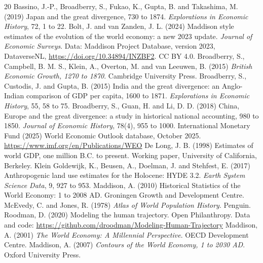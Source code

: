 \documentclass[11pt,a4paper]{article}
\begin{document}
\begin{thebibliography}{20}
 Bassino, J.-P., Broadberry, S., Fukao, K., Gupta, B. and Takashima, M. (2019) Japan and the great divergence, 730 to 1874. \textit{Explorations in Economic History}, 72, 1 to 22.
 Bolt, J. and van Zanden, J. L. (2024) Maddison style estimates of the evolution of the world economy: a new 2023 update. \textit{Journal of Economic Surveys}. Data: Maddison Project Database, version 2023, DataverseNL, \url{https://doi.org/10.34894/INZBF2}. CC BY 4.0.
 Broadberry, S., Campbell, B. M. S., Klein, A., Overton, M. and van Leeuwen, B. (2015) \textit{British Economic Growth, 1270 to 1870}. Cambridge University Press.
 Broadberry, S., Custodis, J. and Gupta, B. (2015) India and the great divergence: an Anglo-Indian comparison of GDP per capita, 1600 to 1871. \textit{Explorations in Economic History}, 55, 58 to 75.
 Broadberry, S., Guan, H. and Li, D. D. (2018) China, Europe and the great divergence: a study in historical national accounting, 980 to 1850. \textit{Journal of Economic History}, 78(4), 955 to 1000.
 International Monetary Fund (2025) World Economic Outlook database, October 2025. \url{https://www.imf.org/en/Publications/WEO}
 De Long, J. B. (1998) Estimates of world GDP, one million B.C. to present. Working paper, University of California, Berkeley.
 Klein Goldewijk, K., Beusen, A., Doelman, J. and Stehfest, E. (2017) Anthropogenic land use estimates for the Holocene: HYDE 3.2. \textit{Earth System Science Data}, 9, 927 to 953.
 Maddison, A. (2010) Historical Statistics of the World Economy: 1 to 2008 AD. Groningen Growth and Development Centre.
 McEvedy, C. and Jones, R. (1978) \textit{Atlas of World Population History}. Penguin.
 Roodman, D. (2020) Modeling the human trajectory. Open Philanthropy. Data and code: \url{https://github.com/droodman/Modeling-Human-Trajectory}
 Maddison, A. (2001) \textit{The World Economy: A Millennial Perspective}. OECD Development Centre.
 Maddison, A. (2007) \textit{Contours of the World Economy, 1 to 2030 AD}. Oxford University Press.

\end{thebibliography}
\end{document}
